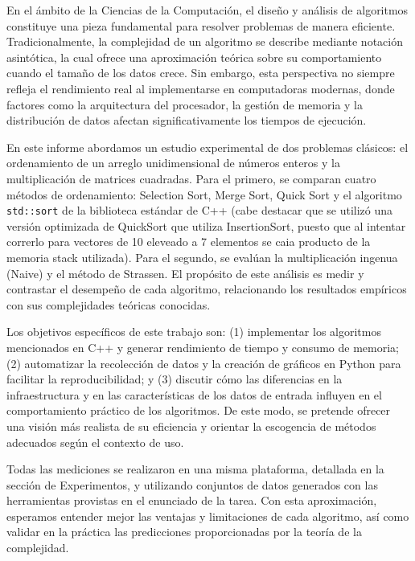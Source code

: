 En el ámbito de la Ciencias de la Computación, el diseño y análisis de algoritmos constituye una pieza fundamental para resolver problemas de manera eficiente. Tradicionalmente, la complejidad de un algoritmo se describe mediante notación asintótica, la cual ofrece una aproximación teórica sobre su comportamiento cuando el tamaño de los datos crece. Sin embargo, esta perspectiva no siempre refleja el rendimiento real al implementarse en computadoras modernas, donde factores como la arquitectura del procesador, la gestión de memoria y la distribución de datos afectan significativamente los tiempos de ejecución.

En este informe abordamos un estudio experimental de dos problemas clásicos: el ordenamiento de un arreglo unidimensional de números enteros y la multiplicación de matrices cuadradas. Para el primero, se comparan cuatro métodos de ordenamiento: Selection Sort, Merge Sort, Quick Sort y el algoritmo \texttt{std::sort} de la biblioteca estándar de C++ (cabe destacar que se utilizó una versión optimizada de QuickSort que utiliza InsertionSort, puesto que al intentar correrlo para vectores de 10 eleveado a 7 elementos se caia producto de la memoria stack utilizada). Para el segundo, se evalúan la multiplicación ingenua (Naive) y el método de Strassen. El propósito de este análisis es medir y contrastar el desempeño de cada algoritmo, relacionando los resultados empíricos con sus complejidades teóricas conocidas.

Los objetivos específicos de este trabajo son: (1) implementar los algoritmos mencionados en C++ y generar rendimiento de tiempo y consumo de memoria; (2) automatizar la recolección de datos y la creación de gráficos en Python para facilitar la reproducibilidad; y (3) discutir cómo las diferencias en la infraestructura y en las características de los datos de entrada influyen en el comportamiento práctico de los algoritmos. De este modo, se pretende ofrecer una visión más realista de su eficiencia y orientar la escogencia de métodos adecuados según el contexto de uso.

Todas las mediciones se realizaron en una misma plataforma, detallada en la sección de Experimentos, y utilizando conjuntos de datos generados con las herramientas provistas en el enunciado de la tarea. Con esta aproximación, esperamos entender mejor las ventajas y limitaciones de cada algoritmo, así como validar en la práctica las predicciones proporcionadas por la teoría de la complejidad.




